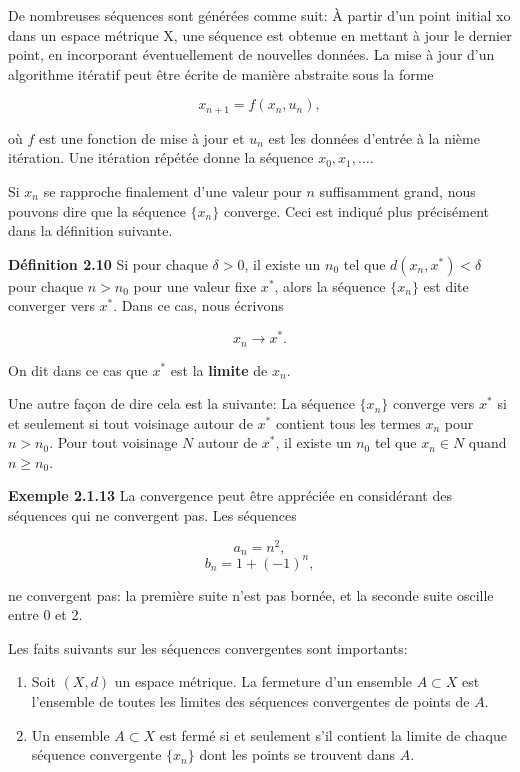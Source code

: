 \documentclass[11pt,twoside,a4paper]{article}
\begin{document}
De nombreuses séquences sont générées comme suit: À partir d'un point initial xo dans un espace métrique X, une séquence est obtenue en mettant à jour le dernier point, en incorporant éventuellement de nouvelles données. La mise à jour d'un algorithme itératif peut être écrite de manière abstraite sous la forme

\begin{equation*}
  x_{n+1} = f(x_n, u_n),
\end{equation*}

où $f$ est une fonction de mise à jour et $u_n$ est les données d'entrée à la nième itération. Une itération répétée donne la séquence $x_0, x_1, \ldots$.

Si $x_n$ se rapproche finalement d'une valeur pour $n$ suffisamment grand, nous pouvons dire que la séquence $\{x_n\}$ converge. Ceci est indiqué plus précisément dans la définition suivante.

\textbf{Définition 2.10} Si pour chaque $\delta > 0$, il existe un $n_0$ tel que $d(x_n, x^*) < \delta$ pour chaque $n > n_0$ pour une valeur fixe $x^*$, alors la séquence $\{x_n\}$ est dite converger vers $x^*$. Dans ce cas, nous écrivons

\begin{equation*}
  x_n \longrightarrow x^*.
\end{equation*}

On dit dans ce cas que $x^*$ est la \textbf{limite} de $x_n$.

Une autre façon de dire cela est la suivante: La séquence $\{x_n\}$ converge vers $x^*$ si et seulement si tout voisinage autour de $x^*$ contient tous les termes $x_n$ pour $n > n_0$. Pour tout voisinage $N$ autour de $x^*$, il existe un $n_0$ tel que $x_n \in N$ quand $n \geq n_0$.

\textbf{Exemple 2.1.13} La convergence peut être appréciée en considérant des séquences qui ne convergent pas. Les séquences

\begin{equation*}
  a_n = n^2,
\end{equation*}
\begin{equation*}
  b_n = 1 + (-1)^n,
\end{equation*}

ne convergent pas: la première suite n'est pas bornée, et la seconde suite oscille entre 0 et 2.

Les faits suivants sur les séquences convergentes sont importants:

\begin{enumerate}
  \item Soit $(X, d)$ un espace métrique. La fermeture d'un ensemble $A \subset X$ est l'ensemble de toutes les limites des séquences convergentes de points de $A$.
  \item Un ensemble $A \subset X$ est fermé si et seulement s'il contient la limite de chaque séquence convergente $\{x_n\}$ dont les points se trouvent dans $A$.
\end{enumerate}
\end{document}
